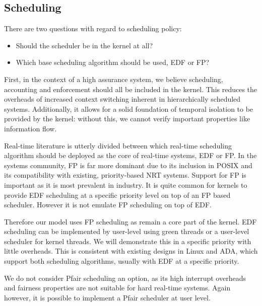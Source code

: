 \subsection{Scheduling}

There are two questions with regard to scheduling policy:

\begin{itemize}
\item Should the scheduler be in the kernel at all?
\item Which base scheduling algorithm should be used, \gls{EDF} or {FP}?
\end{itemize}

First, in the context of a high assurance system, we believe scheduling, accounting and enforcement should all be included in the kernel.
This reduces the overheads of increased context switching inherent in hierarchically scheduled systems.
Additionally, it allows for a solid foundation of temporal isolation to be provided by the kernel: without this, we cannot verify important properties like information flow.

Real-time literature is utterly divided between which real-time scheduling algorithm should be deployed as the core of real-time systems, \gls{EDF} or \gls{FP}.
In the systems community, \gls{FP} is far more dominant due to its inclusion in \gls{POSIX} and its compatibility with existing, priority-based \gls{NRT} systems.
Support for \gls{FP} is important as it is most prevalent in industry.
It is quite common for kernels to provide \gls{EDF} scheduling at a specific priority level on top of an \gls{FP} based scheduler.
However it is not emulate \gls{FP} scheduling on top of \gls{EDF}.

Therefore our model uses \gls{FP} scheduling as remain a core part of the kernel.
\gls{EDF} scheduling can be implemented by user-level using green threads or a user-level scheduler for kernel threads.
We will demonstrate this in %
a specific priority with little overheads.
This is consistent with existing designs in Linux  and ADA\citep{Burns_Wellings:crtpa}, which support both scheduling algorithms, usually with \gls{EDF} at a specific priority.

We do not consider Pfair scheduling an option, as its high interrupt overheads and fairness properties are not suitable for hard real-time systems.
Again however, it is possible to implement a Pfair scheduler at user level.

